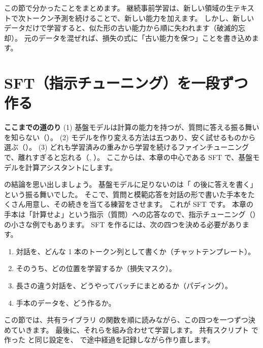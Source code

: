 この節で分かったことをまとめます。
継続事前学習は、新しい領域の生テキストで次トークン予測を続けることで、新しい能力を加えます。
しかし、新しいデータだけで学習すると、似た形の古い能力から順に失われます（破滅的忘却）。
元のデータを混ぜれば、損失の式に「古い能力を保つ」ことを書き込めます。

\section{SFT（指示チューニング）を一段ずつ作る}\label{sec:post-sft}

\begin{center}
\begin{tcolorbox}[bookbox,colback=figgray,borderline west={2.5pt}{0pt}{bookgray},width=0.92\linewidth]
\textbf{ここまでの道のり}\quad
(1) 基盤モデルは計算の能力を持つが、質問に答える振る舞いを知らない（）。
(2) モデルを作り変える方法は五つあり、安く試せるものから選ぶ（）。
(3) どれも学習済みの重みから学習を続けるファインチューニングで、離れすぎると忘れる（, ）。
ここからは、本章の中心である SFT で、基盤モデルを計算アシスタントにします。
\end{tcolorbox}
\end{center}

の結論を思い出しましょう。
基盤モデルに足りないのは「 の後に答えを書く」という振る舞いでした。
そこで、質問と模範応答を対話の形で書いた手本をたくさん用意し、その続きを当てる練習をさせます。
これが SFT です。
本章の手本は「計算せよ」という指示（質問）への応答なので、指示チューニング（）の小さな例でもあります。
SFT を作るには、次の四つを決める必要があります。

\begin{enumerate}
\item 対話を、どんな 1 本のトークン列として書くか（チャットテンプレート）。
\item そのうち、どの位置を学習するか（損失マスク）。
\item 長さの違う対話を、どうやってバッチにまとめるか（パディング）。
\item 手本のデータを、どう作るか。
\end{enumerate}

この節では、共有ライブラリ  の関数を順に読みながら、この四つを一つずつ決めていきます。
最後に、それらを組み合わせて学習します。
共有スクリプト  で作った  と同じ設定を、 で途中経過を記録しながら作り直します。

